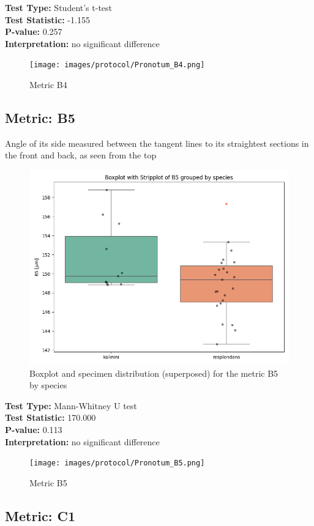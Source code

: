 \noindent\textbf{Test Type:} Student's t-test \\
\noindent\textbf{Test Statistic:} -1.155 \\
\noindent\textbf{P-value:} 0.257 \\
\noindent\textbf{Interpretation:} no significant difference

\begin{figure}[H]
\centering
\texttt{[image: images/protocol/Pronotum\_B4.png]}
\caption{ Metric B4}
\end{figure}

\newpage
\subsection*{Metric: B5}

Angle of its side measured between the tangent lines to its straightest sections in the front and back, as seen from the top 

\begin{figure}[H]
\centering
\includegraphics[width=0.7\linewidth]{images/boxplot/boxplot_B5.png}
\caption{  Boxplot and specimen distribution (superposed) for the metric  B5 by species}
\end{figure}

\noindent\textbf{Test Type:} Mann-Whitney U test \\
\noindent\textbf{Test Statistic:} 170.000 \\
\noindent\textbf{P-value:} 0.113 \\
\noindent\textbf{Interpretation:} no significant difference

\begin{figure}[H]
\centering
\texttt{[image: images/protocol/Pronotum\_B5.png]}
\caption{ Metric B5}
\end{figure}

\newpage
\subsection*{Metric: C1}

